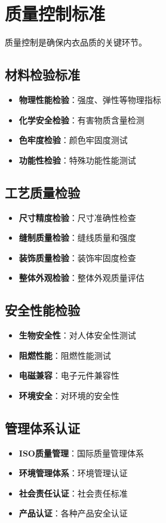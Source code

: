 \documentclass[12pt,UTF8]{ctexbook}
\begin{document}
\section{质量控制标准}
质量控制是确保内衣品质的关键环节。

\subsection{材料检验标准}
\begin{itemize}[leftmargin=2cm]
	\item \textbf{物理性能检验}：强度、弹性等物理指标
	\item \textbf{化学安全检验}：有害物质含量检测
	\item \textbf{色牢度检验}：颜色牢固度测试
	\item \textbf{功能性检验}：特殊功能性能测试
\end{itemize}

\subsection{工艺质量检验}
\begin{itemize}[leftmargin=2cm]
	\item \textbf{尺寸精度检验}：尺寸准确性检查
	\item \textbf{缝制质量检验}：缝线质量和强度
	\item \textbf{装饰质量检验}：装饰牢固度检查
	\item \textbf{整体外观检验}：整体外观质量评估
\end{itemize}

\subsection{安全性能检验}
\begin{itemize}[leftmargin=2cm]
	\item \textbf{生物安全性}：对人体安全性测试
	\item \textbf{阻燃性能}：阻燃性能测试
	\item \textbf{电磁兼容}：电子元件兼容性
	\item \textbf{环境安全}：对环境的安全性
\end{itemize}

\subsection{管理体系认证}
\begin{itemize}[leftmargin=2cm]
	\item \textbf{ISO质量管理}：国际质量管理体系
	\item \textbf{环境管理体系}：环境管理认证
	\item \textbf{社会责任认证}：社会责任标准
	\item \textbf{产品认证}：各种产品安全认证
\end{itemize}
\end{document}
